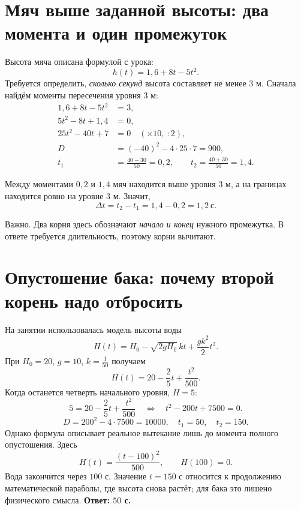 \documentclass[a4paper,11pt]{article}
\newcommand{\caution}[1]{\par\noindent\textcolor{darkaccent}{Важно.} #1\par}
\begin{document}
\section{Мяч выше заданной высоты: два момента и один промежуток}
Высота мяча описана формулой с урока:
\[
 h(t)=1{,}6+8t-5t^2.
\]
Требуется определить, \emph{сколько секунд} высота составляет не менее $3$ м.
Сначала найдём моменты пересечения уровня $3$ м:
\[
\begin{aligned}
1{,}6+8t-5t^2&=3,\\
5t^2-8t+1{,}4&=0,\\
25t^2-40t+7&=0 \quad (\times10,\ :2),\\
D&=(-40)^2-4\cdot25\cdot7=900,\\
t_1&=\frac{40-30}{50}=0{,}2,\qquad
 t_2=\frac{40+30}{50}=1{,}4.
\end{aligned}
\]
\begin{center}
\end{center}
Между моментами $0{,}2$ и $1{,}4$ мяч находится выше уровня $3$ м, а на границах находится ровно на уровне $3$ м. Значит,
\[
\boxed{\Delta t=t_2-t_1=1{,}4-0{,}2=1{,}2\ \text{с}}.
\]
\caution{Два корня здесь обозначают \emph{начало и конец} нужного промежутка. В ответе требуется длительность, поэтому корни вычитают.}
\clearpage

\section{Опустошение бака: почему второй корень надо отбросить}
На занятии использовалась модель высоты воды
\[
H(t)=H_0-\sqrt{2gH_0}\,kt+\frac{gk^2}{2}t^2.
\]
При $H_0=20$, $g=10$, $k=\frac1{50}$ получаем
\[
H(t)=20-\frac25t+\frac{t^2}{500}.
\]
Когда останется четверть начального уровня, $H=5$:
\[
5=20-\frac25t+\frac{t^2}{500}
\quad\Longleftrightarrow\quad t^2-200t+7500=0.
\]
\[
 D=200^2-4\cdot7500=10000,\quad
 t_1=50,\quad t_2=150.
\]
Однако формула описывает реальное вытекание лишь до момента полного опустошения. Здесь
\[
H(t)=\frac{(t-100)^2}{500},\qquad H(100)=0.
\]
Вода закончится через $100$ с. Значение $t=150$ с относится к продолжению математической параболы, где высота снова растёт; для бака это лишено физического смысла. \textbf{Ответ: $50$ с.}
\end{document}
